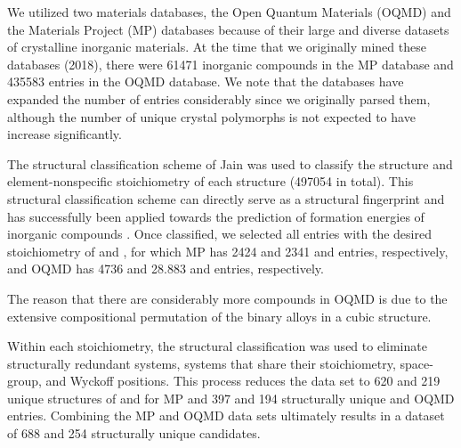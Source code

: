 %
We utilized two materials databases, the Open Quantum Materials (OQMD) and the Materials Project (MP) databases because of their large and diverse datasets of crystalline inorganic materials.
%
At the time that we originally mined these databases (2018), there were \num{61471} inorganic compounds in the MP database and \num{435583} entries in the OQMD database. We note that the databases have expanded the number of entries considerably since we originally parsed them, although the number of unique crystal polymorphs is not expected to have increase significantly.

%
The structural classification scheme of Jain  was used to classify the structure and element-nonspecific stoichiometry of each structure (\num{497054} in total). This structural classification scheme can directly serve as a structural fingerprint and has successfully been applied towards the prediction of formation energies of inorganic compounds \cite{Jain2018}.
%
%
Once classified, we selected all entries with the desired stoichiometry of \ABtwo and \ABthree,
for which MP has \num{2424} and \num{2341} \ABtwo and \ABthree entries, respectively,
and OQMD has \num{4736} and \num{28,883} \ABtwo and \ABthree entries, respectively.

The reason that there are considerably more \ABthree compounds in OQMD is due to the extensive compositional permutation of the binary alloys in a cubic  \ABthree structure.




Within each stoichiometry, the structural classification was used to eliminate structurally redundant systems,  systems that share their stoichiometry, space-group, and Wyckoff positions. This process reduces the data set to \num{620} and \num{219} unique structures of \ABtwo and \ABthree for MP and \num{397} and \num{194} structurally unique \ABtwo and \ABthree OQMD entries.
%
Combining the MP and OQMD data sets ultimately results in a dataset of \num{688} \ABtwo and \num{254} \ABthree structurally unique candidates.
%



